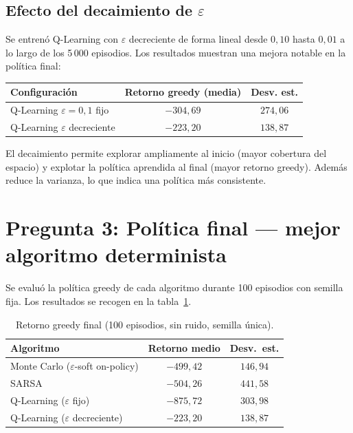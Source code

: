 \documentclass[12pt,a4paper]{article}
\begin{document}
\subsection{Efecto del decaimiento de $\varepsilon$}
\label{sec:decay}

Se entrenó Q-Learning con $\varepsilon$ decreciente de forma lineal desde $0{,}10$
hasta $0{,}01$ a lo largo de los 5\,000 episodios. Los resultados muestran una mejora
notable en la política final:

\begin{center}
\begin{tabular}{lcc}
  \toprule
  Configuración & Retorno greedy (media) & Desv. est. \\
  \midrule
  Q-Learning $\varepsilon=0{,}1$ fijo  & $-304{,}69$ & $274{,}06$ \\
  Q-Learning $\varepsilon$ decreciente & $-223{,}20$ & $138{,}87$ \\
  \bottomrule
\end{tabular}
\end{center}

El decaimiento permite explorar ampliamente al inicio (mayor cobertura del espacio)
y explotar la política aprendida al final (mayor retorno greedy). Además reduce la
varianza, lo que indica una política más consistente.

\section{Pregunta 3: Política final — mejor algoritmo determinista}

Se evaluó la política greedy de cada algoritmo durante 100 episodios con semilla fija.
Los resultados se recogen en la tabla~\ref{tab:greedy}.

\begin{table}[H]
  \centering
  \caption{Retorno greedy final (100 episodios, sin ruido, semilla única).}
  \label{tab:greedy}
  \begin{tabular}{lcc}
    \toprule
    Algoritmo & Retorno medio & Desv.\ est. \\
    \midrule
    Monte Carlo ($\varepsilon$-soft on-policy) & $-499{,}42$ & $146{,}94$ \\
    SARSA                                      & $-504{,}26$ & $441{,}58$ \\
    Q-Learning ($\varepsilon$ fijo)            & $-875{,}72$ & $303{,}98$ \\
    Q-Learning ($\varepsilon$ decreciente)     & $-223{,}20$ & $138{,}87$ \\
    \bottomrule
  \end{tabular}
\end{table}
\end{document}
